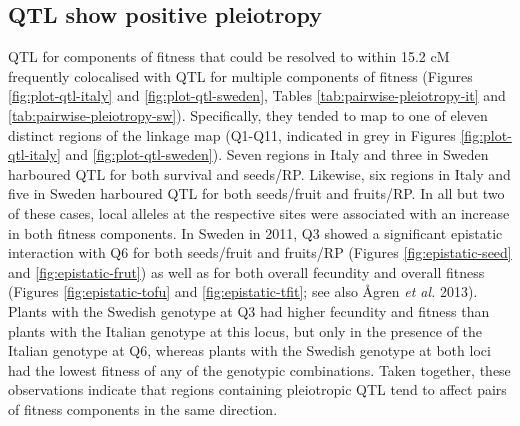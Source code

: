 \documentclass[
]{article}
\begin{document}
\hypertarget{qtl-show-positive-pleiotropy}{%
\subsection{QTL show positive pleiotropy}\label{qtl-show-positive-pleiotropy}}

QTL for components of fitness that could be resolved to within 15.2 cM frequently colocalised with QTL for multiple components of fitness (Figures \ref{fig:plot-qtl-italy} and \ref{fig:plot-qtl-sweden}, Tables \ref{tab:pairwise-pleiotropy-it} and \ref{tab:pairwise-pleiotropy-sw}). Specifically, they tended to map to one of eleven distinct regions of the linkage map (Q1-Q11, indicated in grey in Figures \ref{fig:plot-qtl-italy} and \ref{fig:plot-qtl-sweden}).
Seven regions in Italy and three in Sweden harboured QTL for both survival and seeds/RP.
Likewise, six regions in Italy and five in Sweden harboured QTL for both seeds/fruit and fruits/RP. In all but two of these cases, local alleles at the respective sites were associated with an increase in both fitness components.
In Sweden in 2011, Q3 showed a significant epistatic interaction with Q6 for both seeds/fruit and fruits/RP (Figures \ref{fig:epistatic-seed} and \ref{fig:epistatic-frut}) as well as for both overall fecundity and overall fitness (Figures \ref{fig:epistatic-tofu} and \ref{fig:epistatic-tfit}; see also Ågren \emph{et al.} 2013). Plants with the Swedish genotype at Q3 had higher fecundity and fitness than plants with the Italian genotype at this locus, but only in the presence of the Italian genotype at Q6, whereas plants with the Swedish genotype at both loci had the lowest fitness of any of the genotypic combinations. Taken together, these observations indicate that regions containing pleiotropic QTL tend to affect pairs of fitness components in the same direction.
\end{document}
